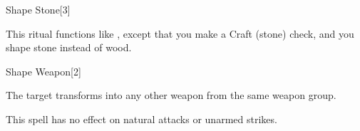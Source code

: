 \begin{spellsection}{Shape Stone}[3]
    \begin{spellheader}
    \end{spellheader}
    \begin{spellcontent}
        \begin{spelltargetinginfo}
        \end{spelltargetinginfo}
        \begin{spelleffects}

            \spellspecial This ritual functions like , except that you make a Craft (stone) check, and you shape stone instead of wood.
        \end{spelleffects}
    \end{spellcontent}
    \begin{spellfooter}
    \end{spellfooter}
\end{spellsection}

\begin{spellsection}{Shape Weapon}[2]
    \begin{spellheader}
    \end{spellheader}
    \begin{spellcontent}
        \begin{spelltargetinginfo}
        \end{spelltargetinginfo}
        \begin{spelleffects}
            \spelleffect The target transforms into any other weapon from the same weapon group.
        \end{spelleffects}
    \end{spellcontent}
    \begin{spellfooter}
        \spellnotes This spell has no effect on natural attacks or unarmed strikes.
    \end{spellfooter}
    \begin{spellaugments}
    \end{spellaugments}
\end{spellsection}


